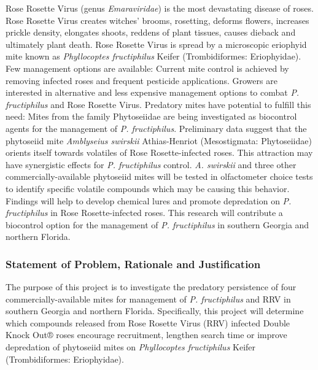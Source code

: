 \documentclass[12pt,final,CPage]{ufthesis}
\begin{document}
{  Rose Rosette Virus (genus \emph{Emaraviridae}) is the most devastating disease of roses. Rose Rosette Virus creates witches' brooms, rosetting, deforms flowers, increases prickle density, elongates shoots, reddens of plant tissues, causes dieback and ultimately plant death. Rose Rosette Virus is spread by a microscopic eriophyid mite known as \emph{Phyllocoptes fructiphilus} Keifer (Trombidiformes: Eriophyidae). Few management options are available: Current mite control is achieved by removing infected roses and frequent pesticide applications. Growers are interested in alternative and less expensive management options to combat \emph{P. fructiphilus} and Rose Rosette Virus. Predatory mites have potential to fulfill this need: Mites from the family Phytoseiidae are being investigated as biocontrol agents for the management of \emph{P. fructiphilus}. Preliminary data suggest that the phytoseiid mite \emph{Amblyseius swirskii} Athias-Henriot (Mesostigmata: Phytoseiidae) orients itself towards volatiles of Rose Rosette-infected roses. This attraction may have synergistic effects for \emph{P. fructiphilus} control. \emph{A. swirskii} and three other commercially-available phytoseiid mites will be tested in olfactometer choice tests to identify specific volatile compounds which may be causing this behavior. Findings will help to develop chemical lures and promote depredation on \emph{P. fructiphilus} in Rose Rosette-infected roses. This research will contribute a biocontrol option for the management of \emph{P. fructiphilus} in southern Georgia and northern Florida.

  \hypertarget{statement-of-problem-rationale-and-justification}{%
  \subsubsection{Statement of Problem, Rationale and Justification}\label{statement-of-problem-rationale-and-justification}}

  The purpose of this project is to investigate the predatory persistence of four commercially-available mites for management of \emph{P. fructiphilus} and RRV in southern Georgia and northern Florida. Specifically, this project will determine which compounds released from Rose Rosette Virus (RRV) infected Double Knock Out® roses encourage recruitment, lengthen search time or improve depredation of phytoseiid mites on \emph{Phyllocoptes fructiphilus} Keifer (Trombidiformes: Eriophyidae).

}
\end{document}
